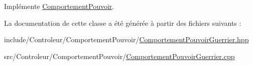 \-Implémente \hyperlink{class_comportement_pouvoir_a8b8f4e753291ab73ab0016106f3948ff}{\-Comportement\-Pouvoir}.



\-La documentation de cette classe a été générée à partir des fichiers suivants \-:\begin{DoxyCompactItemize}
\item 
include/\-Controleur/\-Comportement\-Pouvoir/\hyperlink{_comportement_pouvoir_guerrier_8hpp}{\-Comportement\-Pouvoir\-Guerrier.\-hpp}\item 
src/\-Controleur/\-Comportement\-Pouvoir/\hyperlink{_comportement_pouvoir_guerrier_8cpp}{\-Comportement\-Pouvoir\-Guerrier.\-cpp}\end{DoxyCompactItemize}
